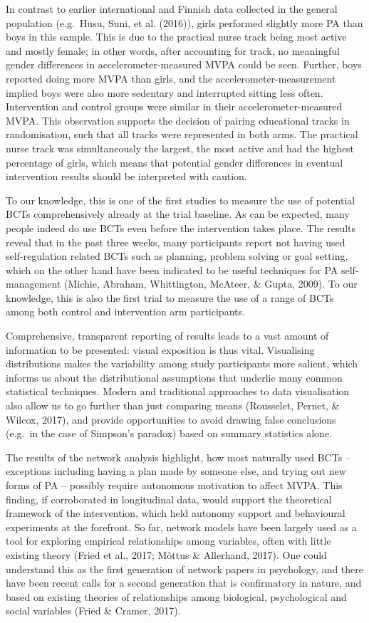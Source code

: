 \documentclass[british,man]{apa6}
\begin{document}
In contrast to earlier international and Finnish data collected in the general population (e.g.~Husu, Suni, et al. (2016)), girls performed slightly more PA than boys in this sample. This is due to the practical nurse track being most active and mostly female; in other words, after accounting for track, no meaningful gender differences in accelerometer-measured MVPA could be seen. Further, boys reported doing more MVPA than girls, and the accelerometer-measurement implied boys were also more sedentary and interrupted sitting less often. Intervention and control groups were similar in their accelerometer-measured MVPA. This observation supports the decision of pairing educational tracks in randomisation, such that all tracks were represented in both arms. The practical nurse track was simultaneously the largest, the most active and had the highest percentage of girls, which means that potential gender differences in eventual intervention results should be interpreted with caution.

To our knowledge, this is one of the first studies to measure the use of potential BCTs comprehensively already at the trial baseline. As can be expected, many people indeed do use BCTs even before the intervention takes place. The results reveal that in the past three weeks, many participants report not having used self-regulation related BCTs such as planning, problem solving or goal setting, which on the other hand have been indicated to be useful techniques for PA self-management (Michie, Abraham, Whittington, McAteer, \& Gupta, 2009). To our knowledge, this is also the first trial to measure the use of a range of BCTs among both control and intervention arm participants.

Comprehensive, transparent reporting of results leads to a vast amount of information to be presented: visual exposition is thus vital. Visualising distributions makes the variability among study participants more salient, which informs us about the distributional assumptions that underlie many common statistical techniques. Modern and traditional approaches to data visualisation also allow us to go further than just comparing means (Rousselet, Pernet, \& Wilcox, 2017), and provide opportunities to avoid drawing false conclusions (e.g.~in the case of Simpson's paradox) based on summary statistics alone.

The results of the network analysis highlight, how most naturally used BCTs -- exceptions including having a plan made by someone else, and trying out new forms of PA -- possibly require autonomous motivation to affect MVPA. This finding, if corroborated in longitudinal data, would support the theoretical framework of the intervention, which held autonomy support and behavioural experiments at the forefront. So far, network models have been largely used as a tool for exploring empirical relationships among variables, often with little existing theory (Fried et al., 2017; Mõttus \& Allerhand, 2017). One could understand this as the first generation of network papers in psychology, and there have been recent calls for a second generation that is confirmatory in nature, and based on existing theories of relationships among biological, psychological and social variables (Fried \& Cramer, 2017).
\end{document}
